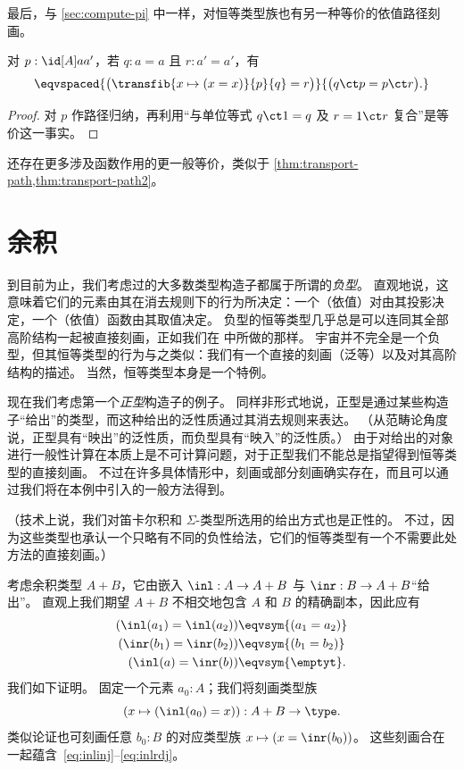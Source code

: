 最后，与 \cref{sec:compute-pi} 中一样，对恒等类型族也有另一种等价的依值路径刻画。

\begin{thm}\label{thm:dpath-path}
  对 $p:\id[A]a{a'}$，若 $q:a=a$ 且 $r:a'=a'$，有
  \[ \eqvspaced{ \big(\transfib{x\mapsto (x=x)}{p}{q} = r \big) }{ \big( q \ct p = p \ct r \big). } \]
\end{thm}
\begin{proof}
  对 $p$ 作路径归纳，再利用“与单位等式 $q\ct 1 = q$ 及 $r = 1\ct r$ 复合”是等价这一事实。
\end{proof}

还存在更多涉及函数作用的更一般等价，类似于 \cref{thm:transport-path,thm:transport-path2}。

%
\section{余积}
\label{sec:compute-coprod}

%
%
到目前为止，我们考虑过的大多数类型构造子都属于所谓的\emph{负型}。
%
%
直观地说，这意味着它们的元素由其在消去规则下的行为所决定：一个（依值）对由其投影决定，一个（依值）函数由其取值决定。
负型的恒等类型几乎总是可以连同其全部高阶结构一起被直接刻画，正如我们在  中所做的那样。
宇宙并不完全是一个负型，但其恒等类型的行为与之类似：我们有一个直接的刻画（泛等）以及对其高阶结构的描述。
当然，恒等类型本身是一个特例。

现在我们考虑第一个\emph{正型}构造子的例子。
%
同样非形式地说，正型是通过某些构造子“给出”的类型，而这种给出的泛性质通过其消去规则来表达。
（从范畴论角度说，正型具有“映出”的泛性质，而负型具有“映入”的泛性质。）
由于对给出的对象进行一般性计算在本质上是不可计算问题，对于正型我们不能总是指望得到恒等类型的直接刻画。
不过在许多具体情形中，刻画或部分刻画确实存在，而且可以通过我们将在本例中引入的一般方法得到。

（技术上说，我们对笛卡尔积和 $\Sigma$-类型所选用的给出方式也是正性的。
不过，因为这些类型也承认一个只略有不同的负性给法，它们的恒等类型有一个不需要此处方法的直接刻画。）

考虑余积类型 $A+B$，它由嵌入 $\inl:A\to A+B$ 与 $\inr:B\to A+B$“给出”。
直观上我们期望 $A+B$ 不相交地包含 $A$ 和 $B$ 的精确副本，因此应有
\begin{align}
  {(\inl(a_1)=\inl(a_2))}&\eqvsym {(a_1=a_2)} \label{eq:inlinj}\\
  {(\inr(b_1)=\inr(b_2))}&\eqvsym {(b_1=b_2)}\\
  {(\inl(a)= \inr(b))} &\eqvsym {\emptyt}. \label{eq:inlrdj}
\end{align}
我们如下证明。
固定一个元素 $a_0:A$；我们将刻画类型族
\begin{equation}
  (x\mapsto (\inl(a_0)=x)) : A+B \to \type.\label{eq:sumcodefam}
\end{equation}
类似论证也可刻画任意 $b_0:B$ 的对应类型族 $x\mapsto (x = \inr(b_0))$。
这些刻画合在一起蕴含~\eqref{eq:inlinj}--\eqref{eq:inlrdj}。

